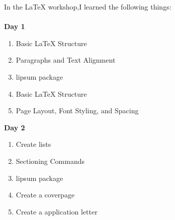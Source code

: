 \documentclass[12pt,a4paper]{article}
\begin{document}
\par\noindent In the LaTeX workshop,I learned the following things:\\\\
\Large{\textbf{Day 1}}
\begin{enumerate}
    \item Basic LaTeX Structure
    \item Paragraphs and Text Alignment
    \item lipsum package
    \item Basic LaTeX Structure
    \item Page Layout, Font Styling, and Spacing    
\end{enumerate}

\Large{\textbf{Day 2}}
\begin{enumerate}
    \item Create lists
    \item Sectioning Commands
    \item lipsum package
    \item Create a coverpage
    \item Create a application letter    
\end{enumerate}
\end{document}
